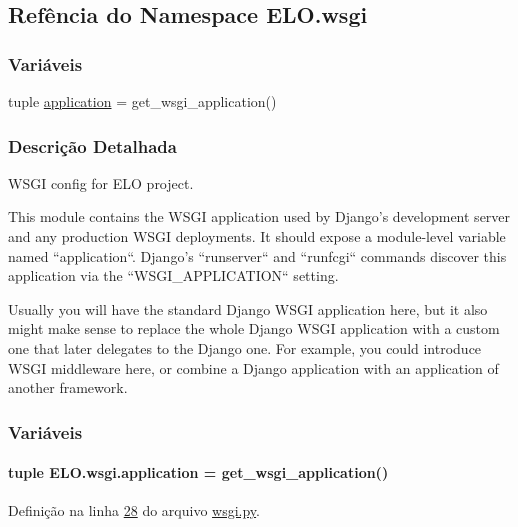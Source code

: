 \hypertarget{namespaceELO_1_1wsgi}{}\subsection{Refência do Namespace E\+L\+O.\+wsgi}
\label{namespaceELO_1_1wsgi}
\subsubsection*{Variáveis}
\begin{DoxyCompactItemize}
\item 
tuple \hyperlink{namespaceELO_1_1wsgi_a8951c4ea2920440aeeb73c65ab517a5d}{application} = get\+\_\+wsgi\+\_\+application()
\end{DoxyCompactItemize}


\subsubsection{Descrição Detalhada}
\begin{DoxyVerb}WSGI config for ELO project.

This module contains the WSGI application used by Django's development server
and any production WSGI deployments. It should expose a module-level variable
named ``application``. Django's ``runserver`` and ``runfcgi`` commands discover
this application via the ``WSGI_APPLICATION`` setting.

Usually you will have the standard Django WSGI application here, but it also
might make sense to replace the whole Django WSGI application with a custom one
that later delegates to the Django one. For example, you could introduce WSGI
middleware here, or combine a Django application with an application of another
framework.\end{DoxyVerb}
 

\subsubsection{Variáveis}
\hypertarget{namespaceELO_1_1wsgi_a8951c4ea2920440aeeb73c65ab517a5d}{}
\paragraph[{application}]{\setlength{\rightskip}{0pt plus 5cm}tuple E\+L\+O.\+wsgi.\+application = get\+\_\+wsgi\+\_\+application()}\label{namespaceELO_1_1wsgi_a8951c4ea2920440aeeb73c65ab517a5d}


Definição na linha \hyperlink{wsgi_8py_source_l00028}{28} do arquivo \hyperlink{wsgi_8py_source}{wsgi.\+py}.

